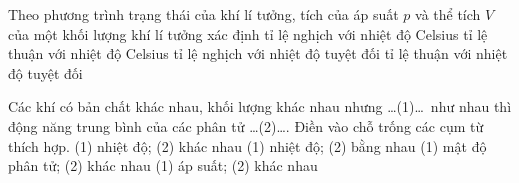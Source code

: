 	\begin{ex}%
		Theo phương trình trạng thái của khí lí tưởng, tích của áp suất $p$ và thể tích $V$ của một khối lượng khí lí tưởng xác định
		\choice
		{tỉ lệ nghịch với nhiệt độ Celsius}
		{tỉ lệ thuận với nhiệt độ Celsius}
		{tỉ lệ nghịch với nhiệt độ tuyệt đối}
		{\True tỉ lệ thuận với nhiệt độ tuyệt đối}
	\end{ex}

	\begin{ex}%
		Các khí có bản chất khác nhau, khối lượng khác nhau nhưng \ldots(1)\ldots\ như nhau thì động năng trung bình của các phân tử \ldots(2)\ldots. Điền vào chỗ trống các cụm từ thích hợp.
		\choice
		{(1) nhiệt độ; (2) khác nhau}
		{\True (1) nhiệt độ; (2) bằng nhau}
		{(1) mật độ phân tử; (2) khác nhau}
		{(1) áp suất; (2) khác nhau}
	\end{ex}

